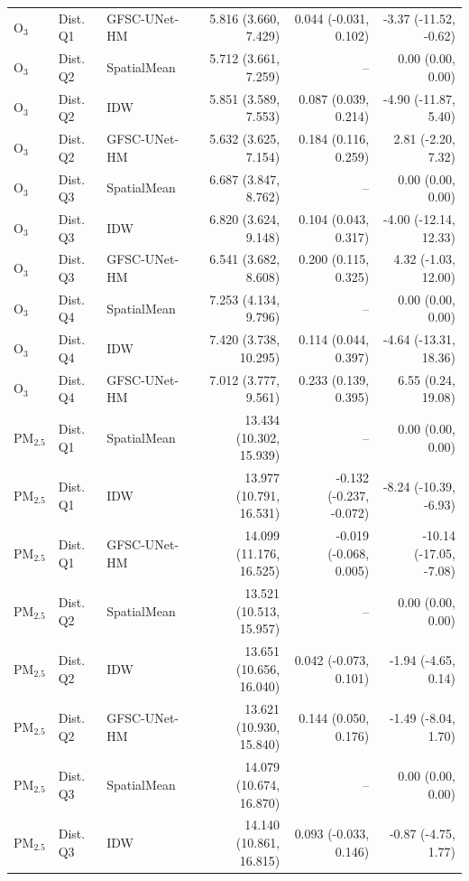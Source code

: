 \begin{table}[t]
\begin{tabular}{lllrrr}
$\mathrm{O}_3$ & Dist. Q1 & GFSC-UNet-HM & 5.816 (3.660, 7.429) & 0.044 (-0.031, 0.102) & -3.37 (-11.52, -0.62) \\
\addlinespace
$\mathrm{O}_3$ & Dist. Q2 & SpatialMean & 5.712 (3.661, 7.259) & -- & 0.00 (0.00, 0.00) \\
$\mathrm{O}_3$ & Dist. Q2 & IDW & 5.851 (3.589, 7.553) & 0.087 (0.039, 0.214) & -4.90 (-11.87, 5.40) \\
$\mathrm{O}_3$ & Dist. Q2 & GFSC-UNet-HM & 5.632 (3.625, 7.154) & 0.184 (0.116, 0.259) & 2.81 (-2.20, 7.32) \\
\addlinespace
$\mathrm{O}_3$ & Dist. Q3 & SpatialMean & 6.687 (3.847, 8.762) & -- & 0.00 (0.00, 0.00) \\
$\mathrm{O}_3$ & Dist. Q3 & IDW & 6.820 (3.624, 9.148) & 0.104 (0.043, 0.317) & -4.00 (-12.14, 12.33) \\
$\mathrm{O}_3$ & Dist. Q3 & GFSC-UNet-HM & 6.541 (3.682, 8.608) & 0.200 (0.115, 0.325) & 4.32 (-1.03, 12.00) \\
\addlinespace
$\mathrm{O}_3$ & Dist. Q4 & SpatialMean & 7.253 (4.134, 9.796) & -- & 0.00 (0.00, 0.00) \\
$\mathrm{O}_3$ & Dist. Q4 & IDW & 7.420 (3.738, 10.295) & 0.114 (0.044, 0.397) & -4.64 (-13.31, 18.36) \\
$\mathrm{O}_3$ & Dist. Q4 & GFSC-UNet-HM & 7.012 (3.777, 9.561) & 0.233 (0.139, 0.395) & 6.55 (0.24, 19.08) \\
\addlinespace
\midrule
$\mathrm{PM}_{2.5}$ & Dist. Q1 & SpatialMean & 13.434 (10.302, 15.939) & -- & 0.00 (0.00, 0.00) \\
$\mathrm{PM}_{2.5}$ & Dist. Q1 & IDW & 13.977 (10.791, 16.531) & -0.132 (-0.237, -0.072) & -8.24 (-10.39, -6.93) \\
$\mathrm{PM}_{2.5}$ & Dist. Q1 & GFSC-UNet-HM & 14.099 (11.176, 16.525) & -0.019 (-0.068, 0.005) & -10.14 (-17.05, -7.08) \\
\addlinespace
$\mathrm{PM}_{2.5}$ & Dist. Q2 & SpatialMean & 13.521 (10.513, 15.957) & -- & 0.00 (0.00, 0.00) \\
$\mathrm{PM}_{2.5}$ & Dist. Q2 & IDW & 13.651 (10.656, 16.040) & 0.042 (-0.073, 0.101) & -1.94 (-4.65, 0.14) \\
$\mathrm{PM}_{2.5}$ & Dist. Q2 & GFSC-UNet-HM & 13.621 (10.930, 15.840) & 0.144 (0.050, 0.176) & -1.49 (-8.04, 1.70) \\
\addlinespace
$\mathrm{PM}_{2.5}$ & Dist. Q3 & SpatialMean & 14.079 (10.674, 16.870) & -- & 0.00 (0.00, 0.00) \\
$\mathrm{PM}_{2.5}$ & Dist. Q3 & IDW & 14.140 (10.861, 16.815) & 0.093 (-0.033, 0.146) & -0.87 (-4.75, 1.77) \\

\end{tabular}
\end{table}
